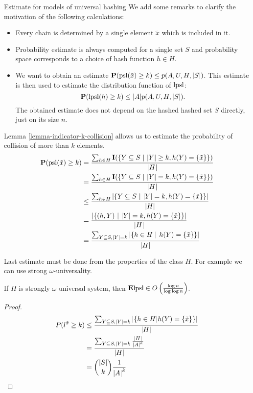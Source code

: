 \begin{section}{Estimate for models of universal hashing}
We add some remarks to clarify the motivation of the following calculations:
\begin{itemize}
\item Every chain is determined by a single element $\tilde{x}$ which is included in it.
\item Probability estimate is always computed for a single set $S$ and probability space corresponds to a choice of hash function $h \in H$.
\item We want to obtain an estimate $\mathbf{P}(\mathrm{psl}(\tilde{x}) \geq k) \leq p(A, U, H, |S|)$. This estimate is then used to estimate the distribution function of $\mathrm{lpsl}$: \[ \mathbf{P}(\mathrm{lpsl}(h) \geq k) \leq |A| p(A, U, H, |S|) \text{.} \] The obtained estimate does not depend on the hashed hashed set $S$ directly, just on its size $n$.
\end{itemize}

Lemma \ref{lemma-indicator-k-collision} allows us to estimate the probability of collision of more than $k$ elements.
\begin{displaymath}
\begin{split}
\mathbf{P}(\mathrm{psl}(\tilde{x}) \geq k) 
	& = \frac{\sum\displaylimits_{h \in H} \mathbf{I}(\{ Y \subseteq S \ | \  |Y| \geq k, h(Y) = \{ \tilde{x} \} \})}{|H|} \\
	& = \frac{\sum\displaylimits_{h \in H} \mathbf{I}(\{ Y \subseteq S \ | \  |Y| = k, h(Y) = \{ \tilde{x} \} \})}{|H|} \\
	& \leq \frac{\sum\displaylimits_{h \in H} |\{ Y \subseteq S \ | \  |Y| = k, h(Y) = \{ \tilde{x} \} \}|}{|H|} \\
	& = \frac{|\{ (h, Y) \ | \  |Y| = k, h(Y) = \{ \tilde{x} \} \}|}{|H|} \\
	& = \frac{\sum\displaylimits_{Y \subseteq S, |Y| = k} | \{ h \in H \ | \  h(Y) = \{\tilde{x}\} \}|}{|H|} \\
\end{split}
\end{displaymath}

Last estimate must be done from the properties of the class $H$. For example we can use strong $\omega$-universality.

\begin{theorem}
If $H$ is strongly $\omega$-universal system, then $\mathbf{E} \mathrm{lpsl} \in O\left(\frac{\log n}{\log \log n}\right)$.
\end{theorem}
\begin{proof}
\begin{displaymath}
\begin{split}
P(l^{\tilde{x}} \geq k) 
	& \leq \frac{\sum\displaylimits_{Y \subseteq S, |Y| = k} | \{ h \in H | h(Y) = \{\tilde{x}\} \}|}{|H|} \\
	& = \frac{\sum\displaylimits_{Y \subseteq S, |Y| = k} \frac{|H|}{{|A|}^{k}}}{|H|} \\
	& = \dbinom{|S|}{k}\frac{1}{{|A|}^k}
\end{split}
\end{displaymath}


\end{proof}
\end{section}
